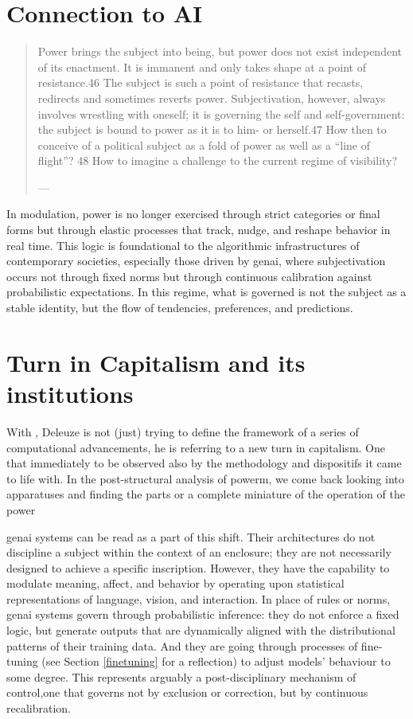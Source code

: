 \section{Connection to AI}



\begin{quote}
	Power brings the subject into being, but power does not exist independent of its enactment. It is immanent and only takes shape at a point of resistance.46 The subject is such a point of resistance that recasts, redirects and sometimes reverts power. Subjectivation, however, always involves wrestling with oneself; it is governing the self and self-government: the subject is bound to power as it is to him- or herself.47 How then to conceive of a political subject as a fold of power as well as a “line of flight”? 48 How to imagine a challenge to the current regime of visibility?

	— \cite[18]{Krasmann2017}
\end{quote}

In modulation, power is no longer exercised through strict categories or final forms but through elastic processes that track, nudge, and reshape behavior in real time. This logic is foundational to the algorithmic infrastructures of contemporary societies, especially those driven by \gls{genai}, where subjectivation occurs not through fixed norms but through continuous calibration against probabilistic expectations. In this regime, what is governed is not the subject as a stable identity, but the flow of tendencies, preferences, and predictions.



\section{Turn in Capitalism and its institutions}
With , Deleuze is not (just) trying to define the
framework of a series of computational advancements, he is referring to a new
turn in capitalism. One that immediately to be observed also by the methodology
and dispositifs it came to life with. In the post-structural analysis of
powerm, we come back looking into apparatuses and finding the parts or a
complete miniature of the operation of the power

\Gls{genai} systems can be read as a part of this shift. Their architectures do not discipline a subject within the context of an enclosure; they are not necessarily designed to achieve a specific inscription. However, they have the capability to modulate meaning, affect, and behavior by operating upon statistical representations of language, vision, and interaction. In place of rules or norms, \gls{genai} systems govern through probabilistic inference: they do not enforce a fixed logic, but generate outputs that are dynamically aligned with the distributional patterns of their training data. And they are going through processes of fine-tuning (see Section \ref{finetuning} for a reflection)
to adjust models' behaviour to some degree. This represents arguably a post-disciplinary mechanism of control,one that governs not by exclusion or correction, but by continuous recalibration.

